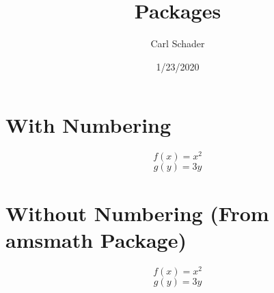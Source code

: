 \documentclass{article}
\title{Packages}
\date{1/23/2020}
\author{Carl Schader}
\begin{document}
	\maketitle

	\section{With Numbering}
	\begin{equation} %
		f(x) = x^2
	\end{equation}
	\begin{equation}
		g(y) = 3y
	\end{equation}

	\section{Without Numbering (From amsmath Package)}
	\begin{equation*} %
		f(x) = x^2
	\end{equation*}
	\begin{equation*}
		g(y) = 3y
	\end{equation*}
\end{document}
